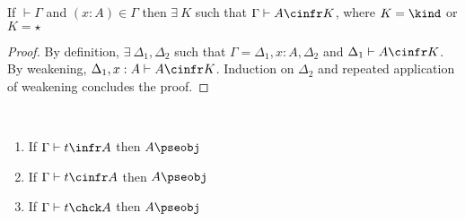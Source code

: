 \begin{lemma}
    If $\vdash \Gamma$ and $(x : A) \in \Gamma$ then $\exists\ K$ such that $\Gamma \vdash A \cinfr K$, where $K = \kind$ or $K = \star$
    \label{lem:2:ctx_get}
\end{lemma}
\begin{proof}
    By definition, $\exists\ \Delta_1, \Delta_2$ such that $\Gamma = \Delta_1, x : A, \Delta_2$ and $\Delta_1 \vdash A \cinfr K$.
    By weakening, $\Delta_1, x : A \vdash A \cinfr K$.
    Induction on $\Delta_2$ and repeated application of weakening concludes the proof.
\end{proof}

\begin{lemma}
    \textcolor{white}{\_}
    \begin{enumerate}
        \item If $\Gamma \vdash t \infr A$ then $A\pseobj$
        \item If $\Gamma \vdash t \cinfr A$ then $A\pseobj$
        \item If $\Gamma \vdash t \chck A$ then $A\pseobj$
    \end{enumerate}
    \label{lem:2:infer_type_is_pseobj}
\end{lemma}
